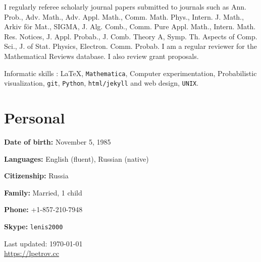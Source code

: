 \documentclass[letterpaper,11pt]{article}
\def\footerlink{https://lpetrov.cc}
\begin{document}


\medskip

I regularly referee scholarly journal papers submitted to journals such as
Ann. Prob., Adv. Math., Adv. Appl. Math., Comm. Math. Phys., Intern. J. Math.,
Arkiv f\"or Mat., SIGMA, J. Alg. Comb., Comm. Pure Appl. Math., Intern. Math.
Res. Notices, J. Appl. Probab., J. Comb. Theory A, Symp. Th. Aspects of Comp.
Sci., J. of Stat. Physics, Electron. Comm. Probab. I am a regular
reviewer for the Mathematical Reviews database. 
I also review grant proposals.






\medskip

Informatic skills : \LaTeX, \texttt{Mathematica}, Computer experimentation,
Probabilistic visualization, \texttt{git}, \texttt{Python},
\texttt{html/jekyll} and web design, \texttt{UNIX}.

\section*{Personal}

\textbf{Date of birth:} November 5, 1985

\textbf{Languages:} English (fluent), Russian (native)

\textbf{Citizenship:} Russia

\textbf{Family:} Married, 1 child

\textbf{Phone:} +1-857-210-7948

\textbf{Skype:} \texttt{lenis2000}

\bigskip

\begin{center}
	\begin{footnotesize}
		Last updated: \today \\ \href{\footerlink}{\url{\footerlink}}
	\end{footnotesize}
\end{center}
\end{document}
